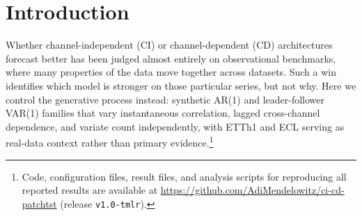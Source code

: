 \documentclass[10pt]{article} %
\begin{document}
\begin{abstract}
        rather than the encoder. Matching the gradient-update budget across modes also removes the deficit, arguing against
        the per-epoch step-count asymmetry as its source, and a block-covariance family extends the same no-advantage finding
        beyond compound-symmetry correlation. Across every tested synthetic cell (AR(1), leader-follower, and block-covariance)
        the absolute CD$-$CI difference stays inside a pre-specified $1\%$ relative-MSE band in both directions. Cost is another
        matter entirely: CD requires smaller feasible batches and far more gradient steps per epoch, its batch size collapses to
        one at $C=84$ in the main grid, and at $C=321$ on ECL (Electricity Consuming Load) a CD epoch costs roughly 956\,s at
        batch 8; in a single-seed comparison at $H \in \{96, 336\}$, CD trails CI by 5.6--7.6\%. On the observational ETTh1
        dataset (hourly electricity-transformer readings, $C=7$), a matched-budget comparison still gives CI a modest but
        reliable edge (pooled CD$-$CI of $+0.0147$ MSE, seed-clustered 95\% CI $[+0.0000, +0.0293]$, significant at horizons
        96 and 720). CI comes out as the better default on accuracy per unit compute. All findings are scoped to PatchTST's
        flattened-token CD formulation, the generative families studied, and a single-T4 training budget.

    \end{abstract}


    \section{Introduction}
    \label{sec:intro}

    Whether channel-independent (CI) or channel-dependent (CD) architectures forecast better has been judged almost entirely on
    observational benchmarks, where many properties of the data move together across datasets. Such a win identifies which model
    is stronger on those particular series, but not why. Here we control the generative process instead: synthetic AR(1) and
    leader-follower VAR(1) families that vary instantaneous correlation, lagged cross-channel dependence, and variate count
    independently, with ETTh1 and ECL serving as real-data context rather than primary evidence.\footnote{Code,
    configuration files, result files, and analysis scripts for reproducing all reported results are available at
    \url{https://github.com/AdiMendelowitz/ci-cd-patchtst} (release \texttt{v1.0-tmlr}).}
\end{document}
